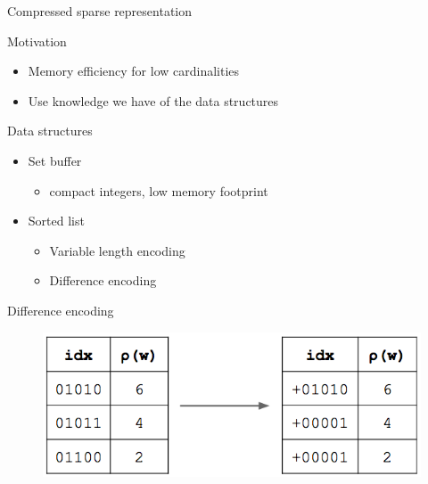 \documentclass{beamer}
\begin{document}


\begin{frame}{Compressed sparse representation}


\begin{block}{Motivation}
\begin{itemize}
\item Memory efficiency for low cardinalities
\item Use knowledge we have of the data structures
\end{itemize}
\end{block}


\begin{block}{Data structures}
\begin{itemize}
\item Set buffer
  \begin{itemize}
  \item compact integers, low memory footprint
  \end{itemize}
\item Sorted list
  \begin{itemize}
  \item Variable length encoding
  \item Difference encoding
  \end{itemize}
\end{itemize}
\end{block}


\end{frame}



\begin{frame}{Difference encoding}

\begin{figure}[c]
\includegraphics [scale=0.5]  {hyperloglog_difference.png}
\end{figure}


\end{frame}
\end{document}
